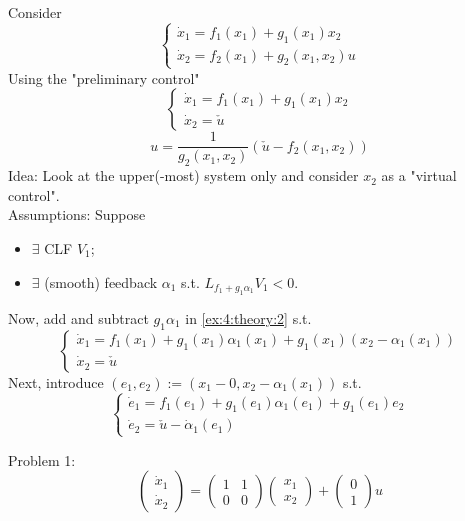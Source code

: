     Consider
    \begin{equation} \label{ex:4:theory:1}
    \left\{\begin{array}{ll}
        \dot x_1 = f_1(x_1)+g_1(x_1)x_2 \\
        \dot x_2 = f_2(x_1)+g_2(x_1,x_2)u
    \end{array} \right.
    \end{equation}
    Using the "preliminary control"
    \begin{equation} \label{ex:4:theory:2}
    \left\{\begin{array}{ll}
        \dot x_1 = f_1(x_1)+g_1(x_1)x_2 \\
        \dot x_2 = \check u
    \end{array} \right.
    \end{equation}
    $$u=\frac{1}{g_2(x_1,x_2)}(\check u - f_2(x_1,x_2))$$
    Idea: Look at the upper(-most) system only and consider $x_2$ as a "virtual control". \\
    
    Assumptions: Suppose \\
    \begin{itemize}
        \item $\exists$ CLF $V_1$;
        \item $\exists$ (smooth) feedback $\alpha_1$ s.t. $L_{f_1+g_1\alpha_1}V_1 < 0$.
    \end{itemize}
    Now, add and subtract $g_1\alpha_1$ in \ref{ex:4:theory:2} s.t.
    \begin{equation} \label{ex:4:theory:3}
    \left\{\begin{array}{ll}
        \dot x_1 = f_1(x_1)+g_1(x_1)\alpha_1(x_1)+g_1(x_1)(x_2-\alpha_1(x_1)) \\
        \dot x_2 = \check u
    \end{array} \right.
    \end{equation}
    Next, introduce $(e_1,e_2):=(x_1-0,x_2-\alpha_1(x_1))$ s.t.
     \begin{equation} \label{ex:4:theory:4}
    \left\{\begin{array}{ll}
        \dot e_1 = f_1(e_1)+g_1(e_1)\alpha_1(e_1)+g_1(e_1)e_2 \\
        \dot e_2 = \check u - \dot \alpha_1(e_1)
    \end{array} \right.
    \end{equation}
    
    Problem 1:
    $$\begin{pmatrix}
        \dot x_1 \\
        \dot x_2
    \end{pmatrix}
    =
    \begin{pmatrix}
        1 & 1 \\
        0 & 0
    \end{pmatrix}
    \begin{pmatrix}
        x_1 \\
        x_2
    \end{pmatrix} + 
    \begin{pmatrix}
        0 \\
        1
    \end{pmatrix} u$$
    
